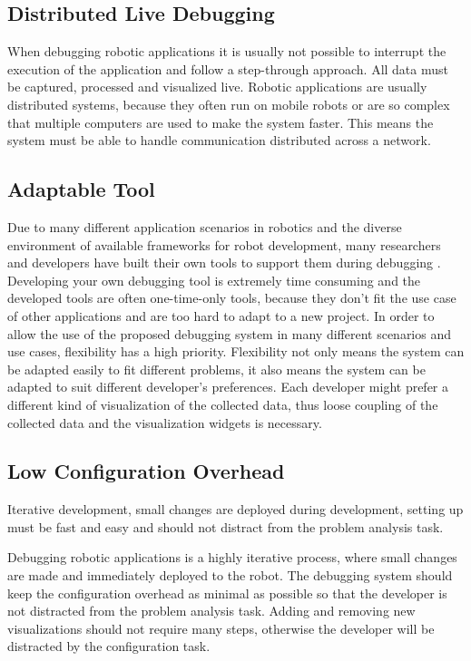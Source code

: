 \subsection{Distributed Live Debugging}
When debugging robotic applications it is usually not possible to interrupt the execution of the application and follow a step-through approach. All data must be captured, processed and visualized live. Robotic applications are usually distributed systems, because they often run on mobile robots or are so complex that multiple computers are used to make the system faster. This means the system must be able to handle communication distributed across a network.

\subsection{Adaptable Tool}
Due to many different application scenarios in robotics and the diverse environment of available frameworks for robot development, many researchers and developers have built their own tools to support them during debugging \cite{Collett2010}. Developing your own debugging tool is extremely time consuming and the developed tools are often one-time-only tools, because they don't fit the use case of other applications and are too hard to adapt to a new project.
In order to allow the use of the proposed debugging system in many different scenarios and use cases, flexibility has a high priority. Flexibility not only means the system can be adapted easily to fit different problems, it also means the system can be adapted to suit different developer's preferences. Each developer might prefer a different kind of visualization of the collected data, thus loose coupling of the collected data and the visualization widgets is necessary.

\subsection{Low Configuration Overhead}
Iterative development, small changes are deployed during development, setting up must be fast and easy and should not distract from the problem analysis task.

Debugging robotic applications is a highly iterative process, where small changes are made and immediately deployed to the robot. The debugging system should keep the configuration overhead as minimal as possible so that the developer is not distracted from the problem analysis task. Adding and removing new visualizations should not require many steps, otherwise the developer will be distracted by the configuration task.

